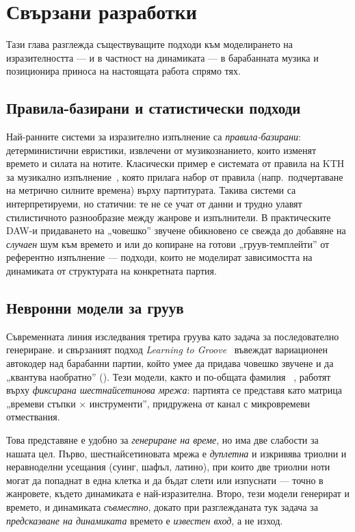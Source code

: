 \chapter{Свързани разработки}
\label{ch:svarzani}

Тази глава разглежда съществуващите подходи към моделирането на изразителността —
и в частност на динамиката — в барабанната музика и позиционира приноса на
настоящата работа спрямо тях.

\section{Правила-базирани и статистически подходи}
\label{sec:svarzani-pravila}

Най-ранните системи за изразително изпълнение са \emph{правила-базирани}:
детерминистични евристики, извлечени от музикознанието, които изменят времето и
силата на нотите. Класически пример е системата от правила на KTH за музикално
изпълнение~\cite{friberg2006overview}, която прилага набор от правила (напр.\
подчертаване на метрично силните времена) върху партитурата. Такива системи са
интерпретируеми, но статични: те не се учат от данни и трудно улавят
стилистичното разнообразие между жанрове и изпълнители. В практическите DAW-и
придаването на „човешко'' звучене обикновено се свежда до добавяне на
\emph{случаен} шум към времето и \eng{velocity} или до копиране на готови
„груув-темплейти'' от референтно
изпълнение — подходи, които не моделират зависимостта на динамиката от
структурата на конкретната партия.

\section{Невронни модели за груув}
\label{sec:svarzani-nevronni}

Съвременната линия изследвания третира груува като задача за
последователно генериране.  и свързаният подход
\emph{Learning to Groove}~\cite{gillick2019groove} въвеждат вариационен
автокодер над барабанни партии, който умее да придава човешко звучене и да
„квантува наобратно'' (\eng{groove transfer}). Тези модели, както и по-общата фамилия
\eng{MusicVAE}~\cite{roberts2018musicvae}, работят върху \emph{фиксирана
шестнайсетинова мрежа}: партията се представя като матрица „времеви стъпки
$\times$ инструменти'', придружена от канал с микровремеви отмествания.

Това представяне е удобно за \emph{генериране на време}, но има две слабости за
нашата цел. Първо, шестнайсетиновата мрежа е \emph{дуплетна} и изкривява триолни
и неравноделни усещания (суинг, шафъл, латино), при които две триолни ноти могат
да попаднат в една клетка и да бъдат слети или изпуснати — точно в жанровете,
където динамиката е най-изразителна. Второ, тези модели генерират и времето, и
динамиката \emph{съвместно}, докато при разглежданата тук задача за
\emph{предсказване на динамиката} времето е \emph{известен вход}, а не изход.

